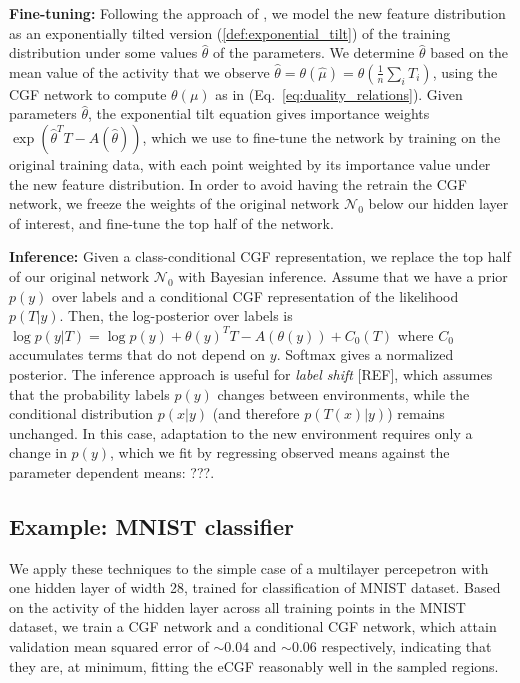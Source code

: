 \documentclass{article}      %
\begin{document}
\textbf{Fine-tuning:} Following the approach of \cite{maity_understanding_2023}, we model the new feature distribution as an exponentially tilted version (\ref{def:exponential_tilt}) of the training distribution  under some values $\hat \theta$ of the parameters.
We determine $\hat \theta$ based on the mean value of the activity that we observe ${\hat \theta = \theta(\hat \mu) = \theta(\frac{1}{n} \sum_i T_i)}$, using the CGF network to compute $\theta(\mu)$ as in (Eq.~\ref{eq:duality_relations}).
Given parameters $\hat \theta$, the exponential tilt equation gives importance weights ${\exp(\hat \theta^T T - A(\hat \theta))}$, which we use to fine-tune the network by training on the original training data, with each point weighted by its importance value under the new feature distribution.
In order to avoid having the retrain the CGF network, we freeze the weights of the original network $\mathcal{N}_0$ below our hidden layer of interest, and fine-tune the top half of the network.


\textbf{Inference:}
Given a class-conditional CGF representation, we replace the top half of our original network $\mathcal{N}_0$ with Bayesian inference.
Assume that we have a prior $p(y)$ over labels and a conditional CGF representation of the likelihood $p(T|y)$.
Then, the log-posterior over labels is ${\log p(y|T) = \log p(y) + \theta(y)^T T - A(\theta(y)) + C_0(T)}$ where $C_0$ accumulates terms that do not depend on $y$.
Softmax gives a normalized posterior.
The inference approach is useful for \textit{label shift} [REF], which assumes that the probability labels $p(y)$ changes between environments, while the conditional distribution $p(x|y)$ (and therefore $p(T(x)|y)$) remains unchanged.
In this case, adaptation to the new environment requires only a change in $p(y)$, which we fit by regressing observed means against the parameter dependent means: ???.



\subsection{Example: MNIST classifier}

We apply these techniques to the simple case of a multilayer percepetron with one hidden layer of width 28, trained for classification of MNIST dataset.
Based on the activity of the hidden layer across all training points in the MNIST dataset, we train a CGF network and a conditional CGF network, which attain validation mean squared error of $\sim 0.04$ and $\sim 0.06$ respectively, indicating that they are, at minimum, fitting the eCGF reasonably well in the sampled regions.
\end{document}
